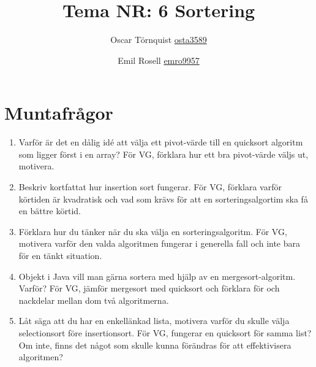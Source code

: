 \documentclass[a5paper,10pt,oneside]{article}
\title{Tema NR: 6 Sortering}
\author{Oscar Törnquist \url{osta3589} \and Emil Rosell \url{emro9957}}
\begin{document}
\maketitle

\section*{Muntafrågor}
\begin{enumerate}
\item Varför är det en dålig idé att välja ett pivot-värde till en quicksort algoritm som ligger först i en array? För VG, förklara hur ett bra pivot-värde väljs ut, motivera.
\item Beskriv kortfattat hur insertion sort fungerar. För VG, förklara varför körtiden är kvadratisk och vad som krävs för att en sorteringsalgortim ska få en bättre körtid.
\item Förklara hur du tänker när du ska välja en sorteringsalgoritm. För VG, motivera varför den valda algoritmen fungerar i generella fall och inte bara för en tänkt situation.
\item Objekt i Java vill man gärna sortera med hjälp av en mergesort-algoritm. Varför? För VG, jämför mergesort med quicksort och förklara för och nackdelar mellan dom två algoritmerna.
\item Låt säga att du har en enkellänkad lista, motivera varför du skulle välja selectionsort före insertionsort. För VG, fungerar en quicksort för samma list? Om inte, finns det något som skulle kunna förändras för att effektivisera algoritmen?
\end{enumerate}
\end{document}
